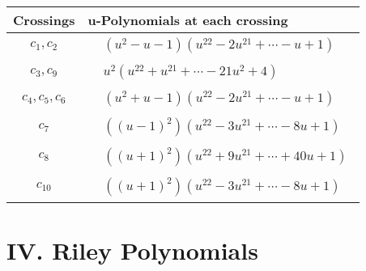 \documentclass[1p]{elsarticle_modified}
\theoremstyle{definition}
\begin{document}
\begin{tabular}{m{50pt}|m{274pt}}
Crossings & \hspace{64pt}u-Polynomials at each crossing \\
\hline $$\begin{aligned}c_{1},c_{2}\end{aligned}$$&$\begin{aligned}
&(u^2- u-1)(u^{22}-2 u^{21}+\cdots- u+1)
\end{aligned}$\\
\hline $$\begin{aligned}c_{3},c_{9}\end{aligned}$$&$\begin{aligned}
&u^2(u^{22}+u^{21}+\cdots-21 u^2+4)
\end{aligned}$\\
\hline $$\begin{aligned}c_{4},c_{5},c_{6}\end{aligned}$$&$\begin{aligned}
&(u^2+u-1)(u^{22}-2 u^{21}+\cdots- u+1)
\end{aligned}$\\
\hline $$\begin{aligned}c_{7}\end{aligned}$$&$\begin{aligned}
&((u-1)^2)(u^{22}-3 u^{21}+\cdots-8 u+1)
\end{aligned}$\\
\hline $$\begin{aligned}c_{8}\end{aligned}$$&$\begin{aligned}
&((u+1)^2)(u^{22}+9 u^{21}+\cdots+40 u+1)
\end{aligned}$\\
\hline $$\begin{aligned}c_{10}\end{aligned}$$&$\begin{aligned}
&((u+1)^2)(u^{22}-3 u^{21}+\cdots-8 u+1)
\end{aligned}$\\
\hline
\end{tabular}\newpage\renewcommand{\arraystretch}{1}
\centering \section*{ IV. Riley Polynomials}
\end{document}
